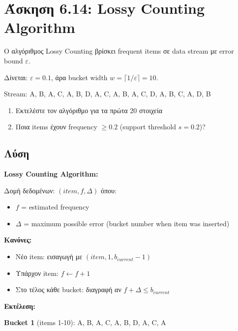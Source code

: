 \section{Άσκηση 6.14: Lossy Counting Algorithm}

\begin{formulabox}[Εκφώνηση]
Ο αλγόριθμος Lossy Counting βρίσκει frequent items σε data stream με
error bound $\varepsilon$.

Δίνεται: $\varepsilon = 0.1$, άρα bucket width $w = \lceil 1/\varepsilon \rceil = 10$.

Stream: A, B, A, C, A, B, D, A, C, A, B, A, C, D, A, B, C, A, D, B

\begin{enumerate}
    \item Εκτελέστε τον αλγόριθμο για τα πρώτα 20 στοιχεία
    \item Ποια items έχουν frequency $\geq 0.2$ (support threshold $s = 0.2$)?
\end{enumerate}
\end{formulabox}

\subsection*{Λύση}

\textbf{Lossy Counting Algorithm:}

Δομή δεδομένων: $(item, f, \Delta)$ όπου:
\begin{itemize}
    \item $f$ = estimated frequency
    \item $\Delta$ = maximum possible error (bucket number when item was inserted)
\end{itemize}

\textbf{Κανόνες:}
\begin{itemize}
    \item Νέο item: εισαγωγή με $(item, 1, b_{current} - 1)$
    \item Υπάρχον item: $f \leftarrow f + 1$
    \item Στο τέλος κάθε bucket: διαγραφή αν $f + \Delta \leq b_{current}$
\end{itemize}

\textbf{Εκτέλεση:}

\textbf{Bucket 1} (items 1-10): A, B, A, C, A, B, D, A, C, A

